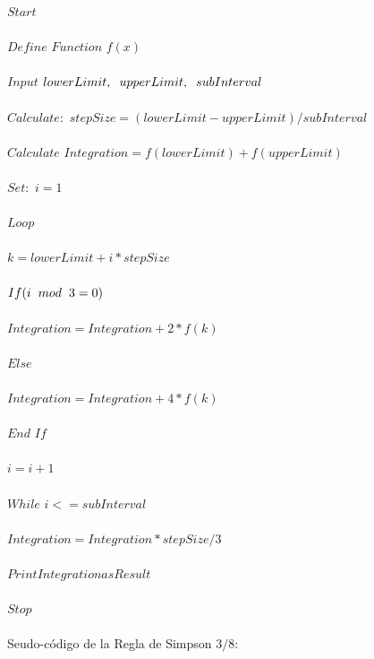 \documentclass[journal,transmag]{IEEEtran}
\theoremstyle{mytheoremstyle}
\theoremstyle{mytheoremstyle}
\theoremstyle{myproblemstyle}
\begin{document}
        $Start$ \\ \\
        $Define$ $Function$ $f(x)$ \\ \\
        $Input$ $lowerLimit, \hspace{0.2cm} upperLimit, \hspace{0.2cm} subInterval$ \\ \\
        $Calculate:$ $stepSize = (lowerLimit - upperLimit)/subInterval$ \\ \\
        $Calculate$ $Integration = f(lowerLimit) + f(upperLimit)$ \\ \\
        $Set:$ $i = 1$ \\ \\
        $Loop$ \\ \\
            $k = lowerLimit + i * stepSize$ \\ \\
            $If (i \hspace{0.2cm} mod \hspace{0.2cm} 3 = 0)$ \\ \\
                $Integration = Integration + 2 * f(k)$ \\ \\
            $Else$ \\ \\
                $Integration = Integration + 4 * f(k)$ \\ \\
            $End$ $If$ \\ \\
            $i = i + 1$ \\ \\
        $While$ $i < = subInterval$ \\ \\
            $Integration = Integration * stepSize/3$ \\ \\
        $Print Integration as Result$ \\ \\
        $Stop$ \\ \\

        Seudo-código de la Regla de Simpson $3/8$: \\
\end{document}
